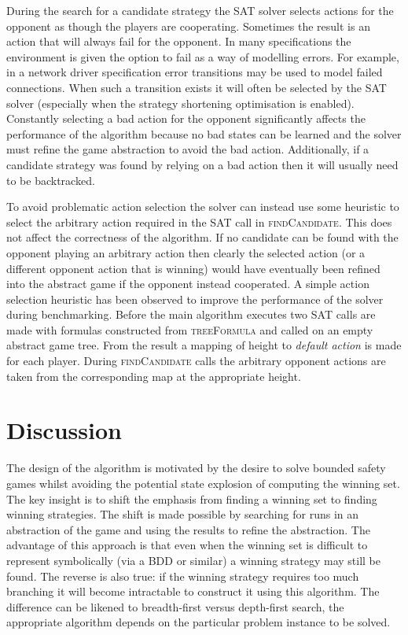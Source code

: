 During the search for a candidate strategy the SAT solver selects actions for the opponent as though the players are cooperating. Sometimes the result is an action that will always fail for the opponent. In many specifications the environment is given the option to fail as a way of modelling errors. For example, in a network driver specification error transitions may be used to model failed connections. When such a transition exists it will often be selected by the SAT solver (especially when the strategy shortening optimisation is enabled). Constantly selecting a bad action for the opponent significantly affects the performance of the algorithm because no bad states can be learned and the solver must refine the game abstraction to avoid the bad action. Additionally, if a candidate strategy was found by relying on a bad action then it will usually need to be backtracked. 

To avoid problematic action selection the solver can instead use some heuristic to select the arbitrary action required in the SAT call in \textsc{findCandidate}. This does not affect the correctness of the algorithm. If no candidate can be found with the opponent playing an arbitrary action then clearly the selected action (or a different opponent action that is winning) would have eventually been refined into the abstract game if the opponent instead cooperated. A simple action selection heuristic has been observed to improve the performance of the solver during benchmarking. Before the main algorithm executes two SAT calls are made with formulas constructed from \textsc{treeFormula} and \textsc{} called on an empty abstract game tree. From the result a mapping of height to \emph{default action} is made for each player. During \textsc{findCandidate} calls the arbitrary opponent actions are taken from the corresponding map at the appropriate height.


\section{Discussion}

The design of the algorithm is motivated by the desire to solve bounded safety games whilst avoiding the potential state explosion of computing the winning set. The key insight is to shift the emphasis from finding a winning set to finding winning strategies. The shift is made possible by searching for runs in an abstraction of the game and using the results to refine the abstraction. The advantage of this approach is that even when the winning set is difficult to represent symbolically (via a BDD or similar) a winning strategy may still be found. The reverse is also true: if the winning strategy requires too much branching it will become intractable to construct it using this algorithm. The difference can be likened to breadth-first versus depth-first search, the appropriate algorithm depends on the particular problem instance to be solved.

